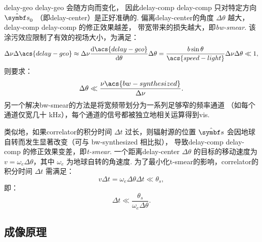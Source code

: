 \acl{delay-geo} \acs{delay-geo} 会随方向而变化，
因此\acl{delay-comp} \acs{delay-comp} 只对特定方向 $\hat{\B{s}}_0$
（即\ac{delay-center}）是正好准确的.
偏离\ac{delay-center}的角度 $\Delta\theta$ 越大，
\acl{delay-comp} \acs{delay-comp} 的修正效果越差，
带宽带来的损失越大，即\emph{\acf{bw-smear}}.
该涂污效应限制了有效的视场大小，为满足：
\begin{equation}
  \Delta\nu \Delta\acs{delay-geo}
    \approx \Delta\nu \diff{\acs{delay-geo}}{\theta} \Delta\theta
    = \frac{b \sin\theta}{\acs{speed-light}} \Delta\nu \Delta\theta
    \ll 1,
\end{equation}
则要求：
\begin{equation}
  \Delta\theta \ll \frac{\nu \acs{bw-synthesized}}{\Delta\nu}.
\end{equation}
另一个解决\ac{bw-smear}的方法是将宽频带划分为一系列足够窄的频率通道
（如每个通道仅宽几十 \si{\kHz}），每个通道的信号都被独立地相关运算得到\ac{vis}.

类似地，如果\ac{correlator}的积分时间 $\Delta t$ 过长，则辐射源的位置 $\hat{\B{s}}$
会因地球自转而发生显著改变（可与 \acs{bw-synthesized} 相比拟），
导致\acl{delay-comp} \acs{delay-comp} 的修正效果变差，即\emph{\acf{t-smear}}.
一个距离\acl{delay-center} $\Delta\theta$ 的目标的移动速度为
$v = \omega_e \Delta\theta$，其中 $\omega_e$ 为地球自转的角速度.
为了最小化\ac{t-smear}的影响，\ac{correlator}的积分时间 $\Delta t$ 需满足：
\begin{equation}
  v \Delta t = \omega_e \Delta\theta \Delta t \ll \theta_s,
\end{equation}
即：
\begin{equation}
  \label{eq:correlator-avgtime}
  \Delta t \ll \frac{\theta_s}{\omega_e \Delta\theta}.
\end{equation}

\subsection{成像原理}


